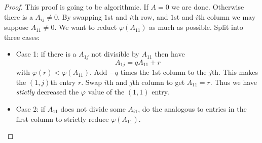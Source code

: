 \documentclass[a4paper]{article}
\theoremstyle{definition}
\begin{document}
\begin{proof}
  This proof is going to be algorithmic. If \(A = 0\) we are done. Otherwise there is a \(A_{ij} \neq 0\). By swapping \(1\)st and \(i\)th row, and \(1\)st and \(i\)th column we may suppose \(A_{11} \neq 0\). We want to reduct \(\varphi(A_{11})\) as much as possible. Split into three cases:
  \begin{itemize}
  \item Case 1: if there is a \(A_{1j}\) not divisible by \(A_{11}\) then have
    \[
      A_{1j} = q A_{11} + r
    \]
    with \(\varphi(r) < \varphi(A_{11})\). Add \(-q\) times the \(1\)st column to the \(j\)th. This makes the \((1,j)\)th entry \(r\). Swap \(i\)th and \(j\)th column to get \(A_{11} = r\). Thus we have \emph{stictly} decreased the \(\varphi\) value of the \((1, 1)\) entry.
  \item Case 2: if \(A_{11}\) does not divide some \(A_{i1}\), do the analogous to entries in the first column to strictly reduce \(\varphi(A_{11})\).


\end{itemize}
\end{proof}
\end{document}
